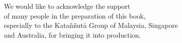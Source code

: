 
\mbox{}\vspace*{-\headsep}\vspace*{2em}

\noindent%
\begin{minipage}[c][\textheight][c]{\paperwidth}

\noindent\hspace*{-20mm}%
\begin{minipage}{\paperwidth}
\centering\small

We would like to acknowledge the support \\
of many people in the preparation of this book, \\
especially to the Kata\~n\~nut\=a Group of Malaysia, Singapore \\
and Australia, for bringing it into production. 
\bigskip

\end{minipage}

\end{minipage}
